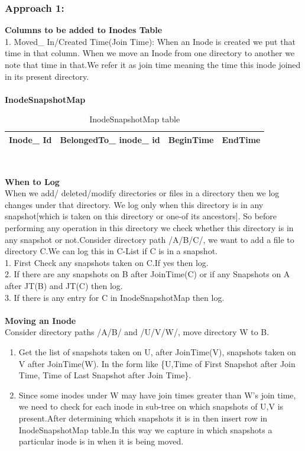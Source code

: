 \subsubsection{Approach 1:}
\textbf{Columns to be added to Inodes Table}\\
1. Moved\_ In/Created Time(Join Time): When an Inode is created we put that time in that column. When we move an Inode from one directory to another we note that time in that.We refer it as join time meaning the time this inode joined in its present directory.\\\\
\textbf{InodeSnapshotMap}\\
\begin{table}[h!]
\begin{tabular}{|c|c|c|c|}
\hline
Inode\_ Id&
BelongedTo\_ inode\_ id&
BeginTime&
EndTime\\
\hline
\end{tabular}\\
\caption{InodeSnapshotMap table}
\label{movedPaths}
\end{table}


\textbf{When to Log}\\
 When we add/ deleted/modify directories or files in a directory then we log changes under that directory. We log only when this directory is in any snapshot[which is taken on this directory or one-of its ancestors]. So before performing any operation in this directory we check whether this directory is in any snapshot or not.Consider directory path /A/B/C/, we want to add a file to directory C.We can log this in C-List if C is in a snapshot. \\
 1. First Check any snapshots taken on C.If yes then log.\\
 2. If there are any snapshots on B after JoinTime(C) or if any Snapshots on A after JT(B) and JT(C) then log.\\
 3. If there is any entry for C in InodeSnapshotMap then log.\\
\\
\textbf{Moving an Inode}\\ 
Consider directory paths /A/B/ and /U/V/W/, move directory W to B.
\begin{enumerate}
\item Get the list of snapshots taken on U, after JoinTime(V), snapshots taken on V after JoinTime(W). In the form like
\{U,Time of First Snapshot after Join Time, Time of Last Snapshot after Join Time\}.
\item Since some inodes under W may have join times greater than W's join time, we need to check for each inode in sub-tree on which snapshots of U,V is present.After determining which snapshots it is in then insert row in InodeSnapshotMap table.In this way we capture in which snapshots a particular inode is in when it is being moved. 

\end{enumerate}

